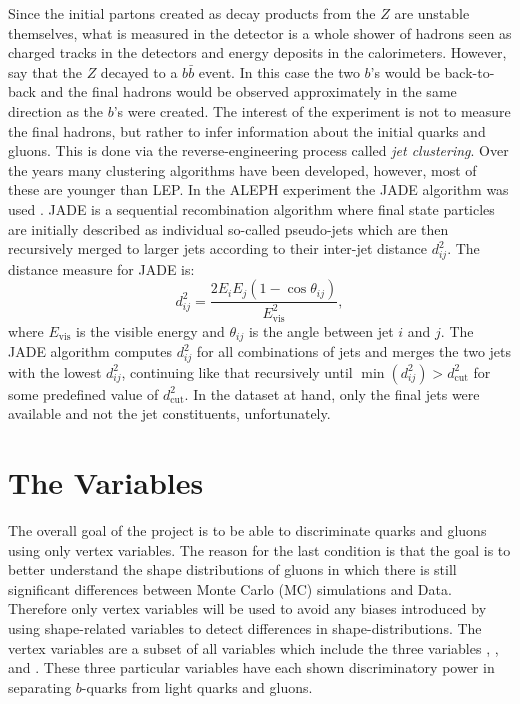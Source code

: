 Since the initial partons created as decay products from the $Z$ are unstable themselves, what is measured in the detector is a whole shower of hadrons seen as charged tracks in the detectors and energy deposits in the calorimeters. However, say that the $Z$  decayed to a $b\bar{b}$ event. In this case the two $b$'s would be back-to-back and the final hadrons would be observed approximately in the same direction as the $b$'s were created. The interest of the experiment is not to measure the final hadrons, but rather to infer information about the initial quarks and gluons. This is done via the reverse-engineering process called \emph{jet clustering}. Over the years many clustering algorithms have been developed, however, most of these are younger than LEP. In the ALEPH experiment the JADE algorithm was used \autocite{bartelExperimentalStudyJets1981}. JADE is a sequential recombination algorithm where final state particles are initially described as individual so-called pseudo-jets which are then recursively merged to larger jets according to their inter-jet distance $d^2_{ij}$. The distance measure for JADE is:
\begin{equation}
  d^2_{ij} = \frac{2E_i E_j (1 - \cos\theta_{ij})}{E^2_\mathrm{vis}},
\end{equation}
where $E_\mathrm{vis}$ is the visible energy and $\theta_{ij}$ is the angle between jet $i$ and $j$. The JADE algorithm computes $d^2_{ij}$ for all combinations of jets and merges the two jets with the lowest $d^2_{ij}$, continuing like that recursively until $\min(d^2_{ij}) > d^2_\mathrm{cut}$ for some predefined value of $d^2_\mathrm{cut}$. In the dataset at hand, only the final jets were available and not the jet constituents, unfortunately. 

\section{The Variables}
The overall goal of the project is to be able to discriminate quarks and gluons using only vertex variables. The reason for the last condition is that the goal is to better understand the shape distributions of gluons in which there is still significant differences between Monte Carlo (MC) simulations and Data. Therefore only vertex variables will be used to avoid any biases introduced by using shape-related variables to detect differences in shape-distributions. 
The vertex variables are a subset of all variables which include the three variables , , and . These three particular variables have each shown discriminatory power in separating $b$-quarks from light quarks and gluons. 

